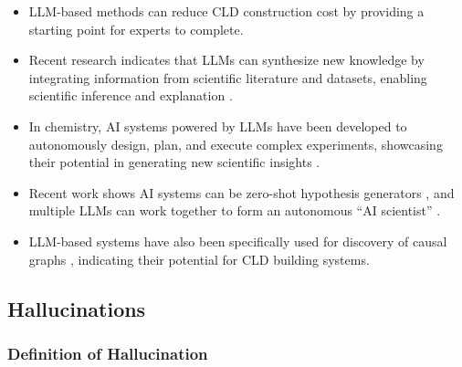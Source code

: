 \documentclass[12pt]{article}
\begin{document}
\begin{itemize}
    \item LLM-based methods can reduce CLD construction cost by providing a starting point for experts to complete.
    \item Recent research indicates that LLMs can synthesize new knowledge by integrating information from scientific literature and datasets, enabling scientific inference and explanation \cite{Zheng2023}.
    \item In chemistry, AI systems powered by LLMs have been developed to autonomously design, plan, and execute complex experiments, showcasing their potential in generating new scientific insights \cite{Feng2023}.
    \item Recent work shows AI systems can be zero-shot hypothesis generators \cite{Qi2023}, and multiple LLMs can work together to form an autonomous ``AI scientist'' \cite{lu2024ai}.
    \item LLM-based systems have also been specifically used for discovery of causal graphs \cite{zhang2024causal}, indicating their potential for CLD building systems.
\end{itemize}

\subsection{Hallucinations}

\subsubsection{Definition of Hallucination}
\end{document}
